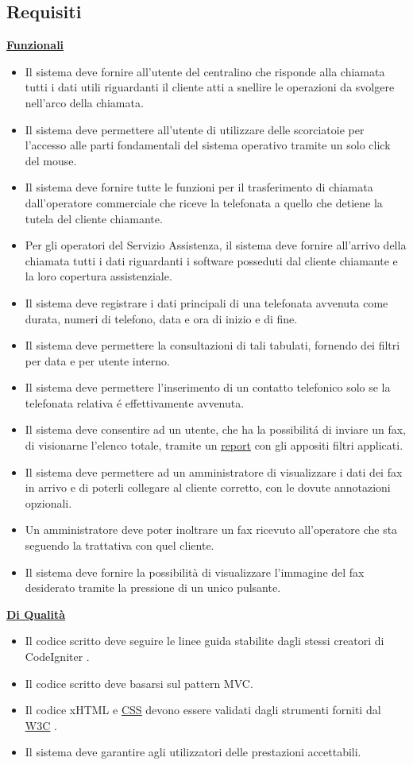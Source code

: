 \subsection{Requisiti}
\underline{\textbf{Funzionali}}
\begin{itemize}
\item Il sistema deve fornire all'utente del centralino che risponde alla chiamata tutti i dati utili riguardanti il cliente atti a snellire le operazioni da svolgere nell'arco della chiamata.
\item Il sistema deve permettere all'utente di utilizzare delle scorciatoie per l'accesso alle parti fondamentali del sistema operativo tramite un solo click del mouse.
\item Il sistema deve fornire tutte le funzioni per il trasferimento di chiamata dall'operatore commerciale che riceve la telefonata a quello che detiene la tutela del cliente chiamante.
\item Per gli operatori del Servizio Assistenza, il sistema deve fornire all'arrivo della chiamata tutti i dati riguardanti i software posseduti dal cliente chiamante e la loro copertura assistenziale.
\item Il sistema deve registrare i dati principali di una telefonata avvenuta come durata, numeri di telefono, data e ora di inizio e di fine. 
\item Il sistema deve permettere la consultazioni di tali tabulati, fornendo dei filtri per data e per utente interno. 
\item Il sistema deve permettere l'inserimento di un contatto telefonico solo se la telefonata relativa \'e effettivamente avvenuta.
\item Il sistema deve consentire ad un utente, che ha la possibilit\'a di inviare un fax, di visionarne l'elenco totale, tramite un \hyperlink{report}{\underline{report}} con gli appositi filtri applicati.
\item Il sistema deve permettere ad un amministratore di visualizzare i dati dei fax in arrivo e di poterli collegare al cliente corretto, con le dovute annotazioni opzionali. 
\item Un amministratore deve poter inoltrare un fax ricevuto all'operatore che sta seguendo la trattativa con quel cliente.
\item Il sistema deve fornire la possibilit\`a di visualizzare l'immagine del fax desiderato tramite la pressione di un unico pulsante.
\end{itemize}

\underline{\textbf{Di Qualit\`a}}
\begin{itemize}
\item Il codice scritto deve seguire le linee guida stabilite dagli stessi creatori di CodeIgniter \cite{cistyle}.
\item Il codice scritto deve basarsi sul pattern MVC.
\item Il codice xHTML e \hyperlink{css}{\underline{CSS}} devono essere validati dagli strumenti forniti dal \hyperlink{w3c}{\underline{W3C}} \cite{due}.
\item Il sistema deve garantire agli utilizzatori delle prestazioni accettabili.
\end{itemize}

